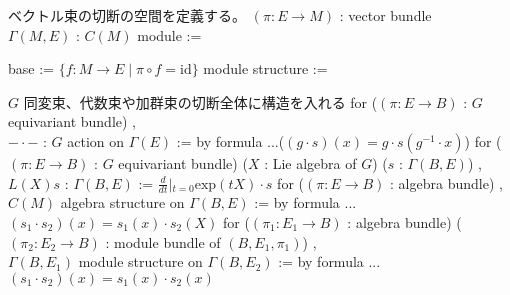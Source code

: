 \begin{Definition}
\itemnote
  ベクトル束の切断の空間を定義する。
\itemdefi
  \For \((\pi : E \to M)\) : vector bundle \\
  \Define \(\Gamma(M , E)\) : \(C(M)\) module :=
  \begin{itemize}
    \itemenum base := \(\{f : M \to E \mid \pi \circ f = \text{id}\}\)
    \itemenum module structure := 
  \end{itemize}
\end{Definition}

\begin{Definition}
\itemnote
  \(G\) 同変束、代数束や加群束の切断全体に構造を入れる
\itemdefi
  for (\((\pi : E \to B)\) : \(G\) equivariant bundle) ,\\
  \(- \cdot -\) : \(G\) action on \(\Gamma(E)\) := by formula ...(\((g \cdot s)(x) = g \cdot s(g^{-1} \cdot x)\))
\itemdefi
  for (\((\pi : E \to B)\) : \(G\) equivariant bundle) (\(X\) : Lie algebra of \(G\)) (\(s\) : \(\Gamma(B , E)\)) ,\\
  \(L(X)s\) : \(\Gamma(B , E)\) := \(\frac{d}{dt}\left|_{t=0} \text{exp}(t X) \cdot s \right.\)
\itemdefi
  for (\((\pi : E \to B)\) : algebra bundle) ,\\
  \(C(M)\) algebra structure on \(\Gamma(B , E)\) := by formula ...\((s_1 \cdot s_2)(x) = s_1(x) \cdot s_2(X)\)
\itemdefi
  for (\((\pi_1 : E_1 \to B)\) : algebra bundle) (\((\pi_2 : E_2 \to B)\) : module bundle of \((B , E_1 , \pi_1)\)) ,\\
  \(\Gamma(B , E_1)\) module structure on \(\Gamma(B , E_2)\) := by formula ...\((s_1 \cdot s_2)(x) = s_1(x) \cdot s_2(x)\)
\end{Definition}


